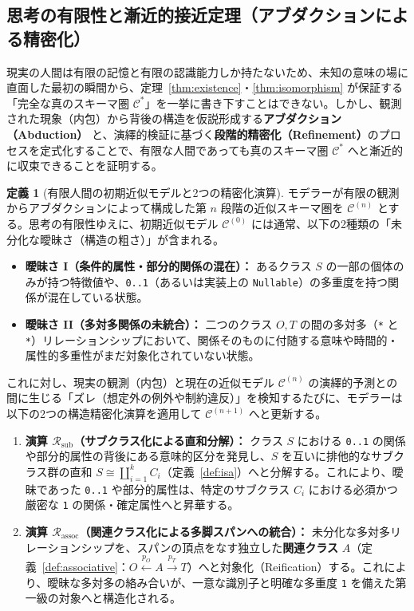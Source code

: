 \documentclass[11pt,a4paper]{ltjsarticle}
\theoremstyle{definition}
\newtheorem{definition}{定義}[section]
\theoremstyle{plain}
\theoremstyle{remark}
\newcommand{\Rsub}{\mathcal{R}_{\mathrm{sub}}}
\newcommand{\Rassoc}{\mathcal{R}_{\mathrm{assoc}}}
\begin{document}
\subsection{思考の有限性と漸近的接近定理（アブダクションによる精密化）}
現実の人間は有限の記憶と有限の認識能力しか持たないため、未知の意味の場に直面した最初の瞬間から、定理~\ref{thm:existence}・\ref{thm:isomorphism} が保証する「完全な真のスキーマ圏 $\mathcal{C}^*$」を一挙に書き下すことはできない。しかし、観測された現象（内包）から背後の構造を仮説形成する\textbf{アブダクション（Abduction）}\cite{peirce1903} と、演繹的検証に基づく\textbf{段階的精密化（Refinement）}のプロセスを定式化することで、有限な人間であっても真のスキーマ圏 $\mathcal{C}^*$ へと漸近的に収束できることを証明する。

\begin{definition}[有限人間の初期近似モデルと2つの精密化演算]\label{def:refinement}
モデラーが有限の観測からアブダクションによって構成した第 $n$ 段階の近似スキーマ圏を $\mathcal{C}^{(n)}$ とする。思考の有限性ゆえに、初期近似モデル $\mathcal{C}^{(0)}$ には通常、以下の2種類の「未分化な曖昧さ（構造の粗さ）」が含まれる。
\begin{itemize}
    \item \textbf{曖昧さ I（条件的属性・部分的関係の混在）：} あるクラス $S$ の一部の個体のみが持つ特徴値や、\texttt{0..1}（あるいは実装上の \texttt{Nullable}）の多重度を持つ関係が混在している状態。
    \item \textbf{曖昧さ II（多対多関係の未統合）：} 二つのクラス $O, T$ の間の多対多（\texttt{*} と \texttt{*}）リレーションシップにおいて、関係そのものに付随する意味や時間的・属性的多重性がまだ対象化されていない状態。
\end{itemize}
これに対し、現実の観測（内包）と現在の近似モデル $\mathcal{C}^{(n)}$ の演繹的予測との間に生じる「ズレ（想定外の例外や制約違反）」を検知するたびに、モデラーは以下の2つの構造精密化演算を適用して $\mathcal{C}^{(n+1)}$ へと更新する。
\begin{enumerate}
    \item \textbf{演算 $\Rsub$（サブクラス化による直和分解）：} クラス $S$ における \texttt{0..1} の関係や部分的属性の背後にある意味的区分を発見し、$S$ を互いに排他的なサブクラス群の直和 $S \cong \coprod_{i=1}^k C_i$（定義~\ref{def:isa}）へと分解する。これにより、曖昧であった \texttt{0..1} や部分的属性は、特定のサブクラス $C_i$ における必須かつ厳密な \texttt{1} の関係・確定属性へと昇華する。
    \item \textbf{演算 $\Rassoc$（関連クラス化による多脚スパンへの統合）：} 未分化な多対多リレーションシップを、スパンの頂点をなす独立した\textbf{関連クラス} $A$（定義~\ref{def:associative}：$O \xleftarrow{p_O} A \xrightarrow{p_T} T$）へと対象化（Reification）する。これにより、曖昧な多対多の絡み合いが、一意な識別子と明確な多重度 \texttt{1} を備えた第一級の対象へと構造化される。
\end{enumerate}
\end{definition}
\end{document}
